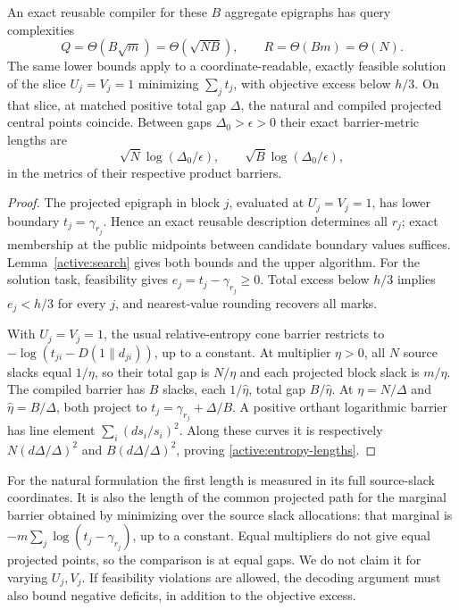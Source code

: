 \begin{proposition}
\label{active:entropy}
An exact reusable compiler for these $B$ aggregate epigraphs has
query complexities
\[
 Q=\Theta(B\sqrt m)=\Theta(\sqrt{NB}),\qquad
 R=\Theta(Bm)=\Theta(N).
\]
The same lower bounds apply to a coordinate-readable, exactly
feasible solution of the slice $U_j=V_j=1$ minimizing
$\sum_jt_j$, with objective excess below $h/3$.
On that slice, at matched positive total gap $\Delta$, the
natural and compiled projected central points coincide. Between
gaps $\Delta_0>\epsilon>0$ their exact barrier-metric lengths are
\begin{equation}\label{active:entropy-lengths}
 \sqrt N\log(\Delta_0/\epsilon),\qquad
 \sqrt B\log(\Delta_0/\epsilon),
\end{equation}
in the metrics of their respective product barriers.
\end{proposition}
\begin{proof}
The projected epigraph in block $j$, evaluated at $U_j=V_j=1$,
has lower boundary $t_j=\gamma_{r_j}$. Hence an exact reusable
description determines all $r_j$; exact membership at the public
midpoints between candidate boundary values suffices.
Lemma~\ref{active:search} gives both bounds and the upper algorithm.
For the solution task, feasibility gives
$e_j=t_j-\gamma_{r_j}\geq0$. Total excess below $h/3$
implies $e_j<h/3$ for every $j$, and nearest-value rounding
recovers all marks.

With $U_j=V_j=1$, the usual relative-entropy cone barrier restricts
to $-\log(t_{ji}-D(1\|d_{ji}))$, up to a constant.
At multiplier $\eta>0$, all $N$ source slacks equal $1/\eta$,
so their total gap is $N/\eta$ and each projected block slack is
$m/\eta$. The compiled barrier has $B$ slacks, each
$1/\widehat\eta$, total gap $B/\widehat\eta$.
At $\eta=N/\Delta$ and $\widehat\eta=B/\Delta$, both project
to $t_j=\gamma_{r_j}+\Delta/B$.
A positive orthant logarithmic barrier has line element
$\sum_i(ds_i/s_i)^2$. Along these curves it is respectively
$N(d\Delta/\Delta)^2$ and $B(d\Delta/\Delta)^2$, proving
\eqref{active:entropy-lengths}.
\end{proof}

For the natural formulation the first length is measured in its
full source-slack coordinates. It is also the length of the common
projected path for the marginal barrier obtained by minimizing
over the source slack allocations: that marginal is
$-m\sum_j\log(t_j-\gamma_{r_j})$, up to a constant.
Equal multipliers do not give equal projected points, so the comparison
is at equal gaps. We do not claim it for varying $U_j,V_j$. If feasibility violations are allowed, the decoding
argument must also bound negative deficits, in addition to the
objective excess.

